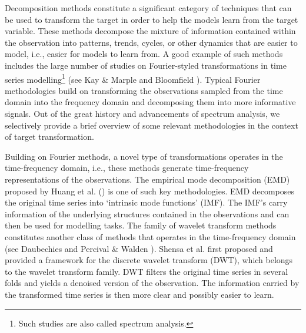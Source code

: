 Decomposition methods constitute a significant category of techniques that can be used to transform the target in order to help the models learn from the target variable. These methods decompose the mixture of information contained within the observation into patterns, trends, cycles, or other dynamics that are easier to model, i.e., easier for models to learn from. A good example of such methods includes the large number of studies on Fourier-styled transformations in time series modelling\footnote{Such studies are also called spectrum analysis.} (see Kay \& Marple \citeyear{kay1981spectrum} and Bloomfield \citeyear{bloomfield2004fourier}). Typical Fourier methodologies build on transforming the observations sampled from the time domain into the frequency domain and decomposing them into more informative signals. Out of the great history and advancements of spectrum analysis, we selectively provide a brief overview of some relevant methodologies in the context of target transformation.

Building on Fourier methods, a novel type of transformations operates in the time-frequency domain, i.e., these methods generate time-frequency representations of the observations. The empirical mode decomposition (EMD) proposed by Huang et al. (\citeyear{huang1998empirical}) is one of such key methodologies. EMD decomposes the original time series into `intrinsic mode functions' (IMF). The IMF's carry information of the underlying structures contained in the observations and can then be used for modelling tasks. The family of wavelet transform methods constitutes another class of methods that operates in the time-frequency domain (see Daubechies \citeyear{daubechies1992ten} and Percival \& Walden \citeyear{percival2000wavelet}). Shensa et al. \citeyear{shensa1992discrete} first proposed and provided a framework for the discrete wavelet transform (DWT), which belongs to the wavelet transform family. DWT filters the original time series in several folds and yields a denoised version of the observation. The information carried by the transformed time series is then more clear and possibly easier to learn.

